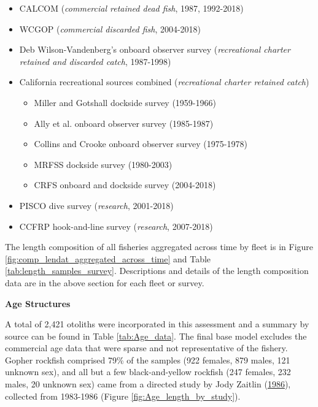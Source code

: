 \documentclass[12pt,]{article}
\begin{document}
\begin{itemize}[noitemsep,nolistsep,topsep=0pt]
  \item CALCOM (\emph{commercial retained dead fish}, 1987, 1992-2018)   
  \item WCGOP (\emph{commercial discarded fish}, 2004-2018)    
  \item Deb Wilson-Vandenberg's onboard observer survey (\emph{recreational charter retained and discarded catch}, 1987-1998)
  \item California recreational sources combined (\emph{recreational charter retained catch})     
    \begin{itemize}[noitemsep,nolistsep]
      \item Miller and Gotshall dockside survey (1959-1966)    
      \item Ally  et al. onboard observer survey (1985-1987)
      \item Collins and Crooke onboard observer survey (1975-1978)     
      \item MRFSS dockside survey (1980-2003)     
      \item CRFS onboard and dockside survey (2004-2018)
    \end{itemize}
 \item PISCO dive survey (\emph{research}, 2001-2018)      
 \item CCFRP hook-and-line survey (\emph{research}, 2007-2018)        
\end{itemize}

The length composition of all fisheries aggregated across time by fleet
is in Figure \ref{fig:comp_lendat_aggregated_across_time} and Table
\ref{tab:length_samples_survey}. Descriptions and details of the length
composition data are in the above section for each fleet or survey.

\vspace{.5cm} \textbf{Age Structures}

A total of 2,421 otoliths were incorporated in this assessment and a
summary by source can be found in Table \ref{tab:Age_data}. The final
base model excludes the commercial age data that were sparse and not
representative of the fishery. Gopher rockfish comprised 79\% of the
samples (922 females, 879 males, 121 unknown sex), and all but a few
black-and-yellow rockfish (247 females, 232 males, 20 unknown sex) came
from a directed study by Jody Zaitlin
(\protect\hyperlink{ref-Zaitlin1986}{1986}), collected from 1983-1986
(Figure \ref{fig:Age_length_by_study}).
\end{document}
